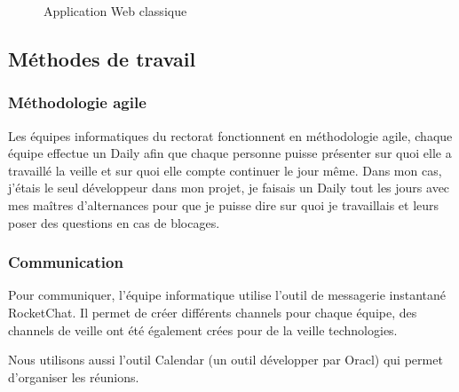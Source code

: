 \documentclass[a4paper]{article}
\begin{document}
\begin{figure}[H]
	\centering
  		\caption{Application Web classique}
	\end{figure}

\subsection{Méthodes de travail}
\subsubsection{Méthodologie agile}

Les équipes informatiques du rectorat fonctionnent en méthodologie agile, chaque équipe effectue un Daily afin que chaque personne puisse présenter sur quoi elle a travaillé la veille et sur quoi elle compte continuer le jour même. Dans mon cas, j'étais le seul développeur dans mon projet, je faisais un Daily tout les jours avec mes maîtres d'alternances pour que je puisse dire sur quoi je travaillais et leurs poser des questions en cas de blocages. 

\subsubsection{Communication}

Pour communiquer, l'équipe informatique utilise l'outil de messagerie instantané RocketChat. Il permet de créer différents
channels pour chaque équipe, des channels de veille ont été également crées pour de la veille technologies.

Nous utilisons aussi l'outil Calendar (un outil développer par Oracl) qui permet d’organiser les réunions.  
\end{document}
